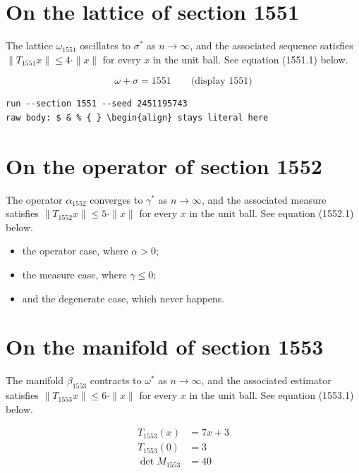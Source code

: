 \documentclass{article}
\begin{document}
\section{On the lattice of section 1551}
The lattice $\omega_{1551}$ oscillates to $\sigma^{*}$ as $n \to \infty$,
and the associated sequence satisfies $\|T_{1551} x\| \leq 4 \cdot \|x\|$
for every $x$ in the unit ball. See equation (1551.1) below.

$$
\omega + \sigma = 1551 \qquad \text{(display 1551)}
$$

\begin{verbatim}
run --section 1551 --seed 2451195743
raw body: $ & % { } \begin{align} stays literal here
\end{verbatim}

\section{On the operator of section 1552}
The operator $\alpha_{1552}$ converges to $\gamma^{*}$ as $n \to \infty$,
and the associated measure satisfies $\|T_{1552} x\| \leq 5 \cdot \|x\|$
for every $x$ in the unit ball. See equation (1552.1) below.

\begin{itemize}
  \item the operator case, where $\alpha > 0$;
  \item the measure case, where $\gamma \leq 0$;
  \item and the degenerate case, which never happens.
\end{itemize}

\section{On the manifold of section 1553}
The manifold $\beta_{1553}$ contracts to $\omega^{*}$ as $n \to \infty$,
and the associated estimator satisfies $\|T_{1553} x\| \leq 6 \cdot \|x\|$
for every $x$ in the unit ball. See equation (1553.1) below.

\begin{align}
T_{1553}(x) &= 7 x + 3 \\
T_{1553}(0) &= 3 \\
\det M_{1553} &= 40
\end{align}
\end{document}
